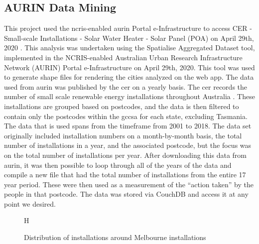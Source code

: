 \documentclass[11pt, oneside]{article}
\begin{document}
\subsection{AURIN Data Mining}
\label{sec:aurin_data_mining}
This project used the \acrfull{ncris}-enabled \acrfull{aurin} Portal e-Infrastructure to access CER - Small-scale Installations - Solar Water Heater - Solar Panel (POA) on April 29th, 2020 \citep{sinnott2015australia}. This analysis was undertaken using the Spatialise Aggregated Dataset tool, implemented in the NCRIS-enabled Australian Urban Research Infrastructure Network (AURIN) Portal e-Infrastructure on April 29th, 2020. This tool was used to generate shape files for rendering the cities analyzed on the web app. 
\newline
\newline
The data used from \acrshort{aurin} was published by the \acrfull{cer} on a yearly basis. The \acrshort{cer} records the number of small scale renewable energy installations throughout Australia \citep{aurin_cer_dataset}. These installations are grouped based on postcodes, and the data is then filtered to contain only the postcodes within the \acrfull{gccsa} for each state, excluding Tasmania. The data that is used spans from the timeframe from 2001 to 2018.
\newline
\newline
The data set originally included installation numbers on a month-by-month basis, the total number of installations in a year, and the associated postcode, but the focus was on the total number of installations per year. After downloading this data from \acrshort{aurin}, it was then possible to loop through all of the years of the data and compile a new file that had the total number of installations from the entire 17 year period. These were then used as a measurement of the \enquote{action taken} by the people in that postcode. The data was stored via CouchDB and access it at any point we desired. 
\newline
\newline

\begin{figure}{H}
  \begin{center}
  \end{center}
  \caption{Distribution of installations around Melbourne installations}
  \label{fig:Distribution of installations around Melbourne}
\end{figure}
\end{document}
